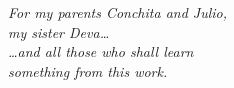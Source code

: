 \thispagestyle{empty}


\begin{minipage}{\linewidth} 
  \vspace{5cm}
   \begin{flushright}
\emph{ For my parents Conchita and Julio, \\ my sister Deva\dots \\ }
  \vspace{.5cm}
 \emph{\dots and all those who shall learn \\ something from this work.}
\end{flushright} 
\end{minipage}